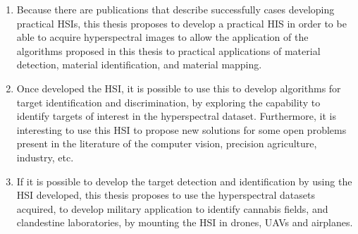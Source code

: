 \documentclass[11pt, oneside]{Thesis} %
\begin{document}
\begin{enumerate}
  \item Because there are publications \cite{PracCam} that describe successfully 
	cases developing practical HSIs, this thesis proposes to develop a practical 
	HIS in order to be able to acquire hyperspectral images to allow the 
	application of the algorithms proposed in this thesis to practical 
	applications of material detection, material identification, and material 
	mapping.
  \item Once developed the HSI, it is possible to use this to develop algorithms 
	for target identification and discrimination, by exploring the capability 
	to identify targets of interest in the hyperspectral dataset. Furthermore, 
	it is interesting to use this HSI to propose new solutions for some open 
	problems present in the literature of the computer vision, precision 
	agriculture, industry, etc.
  \item If it is possible to develop the target detection and identification by 
	using the HSI developed, this thesis proposes to use the hyperspectral 
	datasets acquired, to develop military application to identify cannabis 
	fields, and clandestine laboratories, by mounting the HSI in drones, UAVs 
	and airplanes. 
\end{enumerate}






































\appendix %
\end{document}
